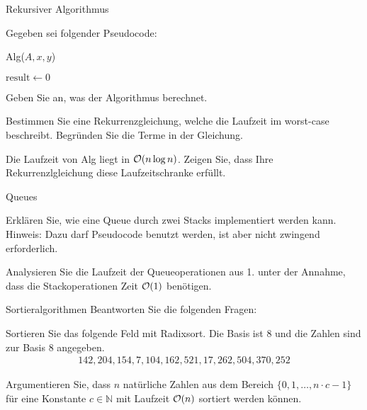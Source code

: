 \documentclass{exercisesheet}
\begin{document}
\begin{eexercises}{Rekursiver Algorithmus}{
    Gegeben sei folgender Pseudocode:
    \begin{algorithm}[ht]
      \caption{Alg($A,x,y$)}
      $\text{result} \gets 0$ \\
    \end{algorithm}
  }
  \item Geben Sie an, was der Algorithmus berechnet.
  \item Bestimmen Sie eine Rekurrenzgleichung, welche die Laufzeit im worst-case beschreibt. Begründen Sie die Terme in der Gleichung.
  \item Die Laufzeit von Alg liegt in $\mathcal{O}(n \log n)$. Zeigen Sie, dass Ihre Rekurrenzlgleichung diese Laufzeitschranke erfüllt.
\end{eexercises}

\begin{exercises}{Queues}
\item Erklären Sie, wie eine Queue durch zwei Stacks implementiert werden kann. Hinweis: Dazu darf Pseudocode benutzt werden, ist aber nicht zwingend erforderlich.
\item Analysieren Sie die Laufzeit der Queueoperationen aus 1. unter der Annahme, dass die Stackoperationen Zeit $\mathcal{O}(1)$ benötigen.
\end{exercises}



\begin{eexercises}{Sortieralgorithmen}{
    Beantworten Sie die folgenden Fragen:
  }
  \item Sortieren Sie das folgende Feld mit Radixsort. Die Basis ist 8 und die Zahlen sind zur Basis 8 angegeben.
  \begin{align*}
    142, 204, 154, 7, 104, 162, 521, 17, 262, 504, 370, 252
  \end{align*}
  \item Argumentieren Sie, dass $n$ natürliche Zahlen aus dem Bereich $\{0, 1, \ldots, n \cdot c - 1\}$ für eine Konstante $c \in \mathbb{N}$ mit Laufzeit $\mathcal{O}(n)$ sortiert werden können.
\end{eexercises}
\end{document}
